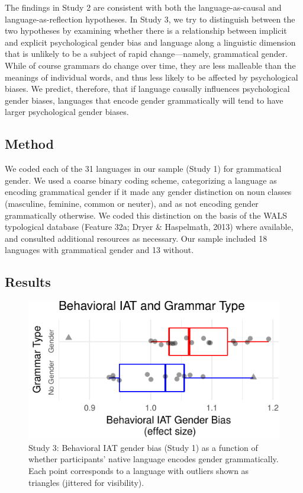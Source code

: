 \documentclass[10pt, letterpaper]{article}
\newenvironment{CodeChunk}{}{}
\begin{document}
The findings in Study 2 are consistent with both the language-as-causal
and language-as-reflection hypotheses. In Study 3, we try to distinguish
between the two hypotheses by examining whether there is a relationship
between implicit and explicit psychological gender bias and language
along a linguistic dimension that is unlikely to be a subject of rapid
change---namely, grammatical gender. While of course grammars do change
over time, they are less malleable than the meanings of individual
words, and thus less likely to be affected by psychological biases. We
predict, therefore, that if language causally influences psychological
gender biases, languages that encode gender grammatically will tend to
have larger psychological gender biases.

\subsection{Method}\label{method-3}

We coded each of the 31 languages in our sample (Study 1) for
grammatical gender. We used a coarse binary coding scheme, categorizing
a language as encoding grammatical gender if it made any gender
distinction on noun classes (masculine, feminine, common or neuter), and
as not encoding gender grammatically otherwise. We coded this
distinction on the basis of the WALS typological database (Feature 32a;
Dryer \& Haspelmath, 2013) where available, and consulted additional
resources as necessary. Our sample included 18 languages with
grammatical gender and 13 without.

\subsection{Results}\label{results-3}

\begin{CodeChunk}
\begin{figure}[t]

{\centering \includegraphics{figs/grammatical_gender_plot-1} 

}

\caption[Study 3]{Study 3: Behavioral IAT gender bias (Study 1) as a function of whether participants' native language encodes gender grammatically. Each point corresponds to a language with outliers shown as triangles (jittered for visibility).}\label{fig:grammatical_gender_plot}
\end{figure}
\end{CodeChunk}
\end{document}

